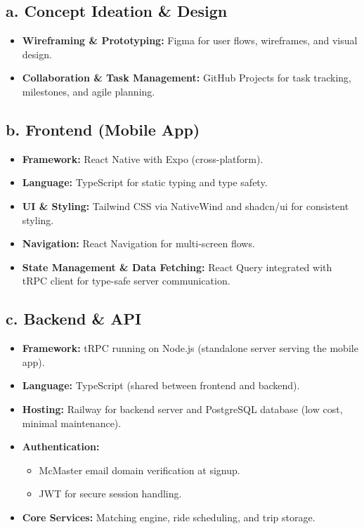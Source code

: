 \documentclass{article}
\begin{document}
\subsection*{a. Concept Ideation \& Design}
\begin{itemize}
    \item \textbf{Wireframing \& Prototyping:} Figma for user flows, wireframes, and visual design.
    \item \textbf{Collaboration \& Task Management:} GitHub Projects for task tracking, milestones, and agile planning.
\end{itemize}

\subsection*{b. Frontend (Mobile App)}
\begin{itemize}
    \item \textbf{Framework:} React Native with Expo (cross-platform).
    \item \textbf{Language:} TypeScript for static typing and type safety.
    \item \textbf{UI \& Styling:} Tailwind CSS via NativeWind and shadcn/ui for consistent styling.
    \item \textbf{Navigation:} React Navigation for multi-screen flows.
    \item \textbf{State Management \& Data Fetching:} React Query integrated with tRPC client for type-safe server communication.
\end{itemize}

\subsection*{c. Backend \& API}
\begin{itemize}
    \item \textbf{Framework:} tRPC running on Node.js (standalone server serving the mobile app).
    \item \textbf{Language:} TypeScript (shared between frontend and backend).
    \item \textbf{Hosting:} Railway for backend server and PostgreSQL database (low cost, minimal maintenance).
    \item \textbf{Authentication:} 
    \begin{itemize}
        \item McMaster email domain verification at signup.
        \item JWT for secure session handling.
    \end{itemize}
    \item \textbf{Core Services:} Matching engine, ride scheduling, and trip storage.
\end{itemize}
\end{document}
